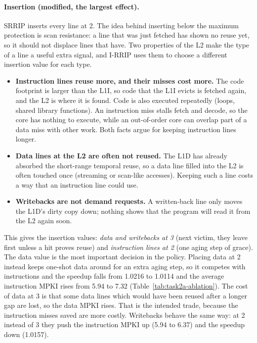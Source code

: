 \documentclass[11pt,a4paper]{article}
\begin{document}
\paragraph{Insertion (modified, the largest effect).} SRRIP inserts every line at 2. The idea
behind inserting below the maximum protection is scan resistance: a line that was just fetched has
shown no reuse yet, so it should not displace lines that have. Two properties of the L2 make
the type of a line a useful extra signal, and I-RRIP uses them to choose a different insertion
value for each type.
\begin{itemize}
    \item \textbf{Instruction lines reuse more, and their misses cost more.} The code footprint
          is larger than the L1I, so code that the L1I evicts is fetched again, and the L2 is where
          it is found. Code is also executed repeatedly (loops, shared library functions). An
          instruction miss stalls fetch and decode, so the core has nothing to execute, while an
          out-of-order core can overlap part of a data miss with other work. Both facts argue for
          keeping instruction lines longer.
    \item \textbf{Data lines at the L2 are often not reused.} The L1D has already absorbed
          the short-range temporal reuse, so a data line filled into the L2 is often touched once
          (streaming or scan-like accesses). Keeping such a line costs a way that an instruction line could use.
    \item \textbf{Writebacks are not demand requests.} A written-back line only moves the L1D's
          dirty copy down; nothing shows that the program will read it from the L2 again soon.
\end{itemize}
This gives the insertion values: \emph{data and writebacks at 3} (next victim, they leave first
unless a hit proves reuse) and \emph{instruction lines at 2} (one aging step of grace). The data
value is the most important decision in the policy. Placing data at 2 instead keeps one-shot
data around for an extra aging step, so it competes with instructions and the speedup falls from 1.0216 to 1.0114
and the average instruction MPKI rises from 5.94 to 7.32 (Table~\ref{tab:task2a-ablation}). The cost
of data at 3 is that some data lines which would have been reused after a longer gap are lost,
so the data MPKI rises. That is the intended trade, because the instruction misses saved are more costly. Writebacks
behave the same way: at 2 instead of 3 they push the instruction MPKI up (5.94 to 6.37) and the
speedup down (1.0157).
\end{document}
